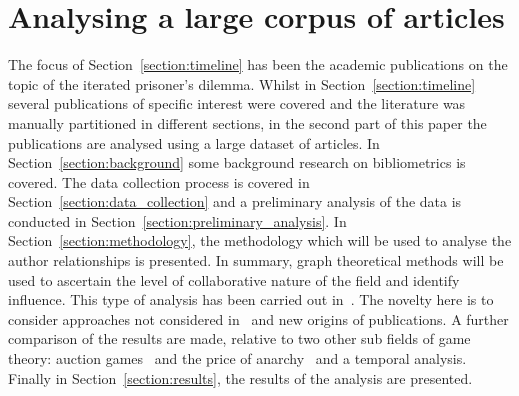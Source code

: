 \documentclass{article}
\theoremstyle{definition}
\begin{document}


\section{Analysing a large corpus of articles}\label{section:analysis}

The focus of Section~\ref{section:timeline} has been the academic publications on
the topic of the iterated prisoner's dilemma. Whilst in Section~\ref{section:timeline}
several publications of specific interest were covered and the literature was manually
partitioned in different sections, in the second part of this paper the publications
are analysed using a large dataset of articles. In Section~\ref{section:background}
some background
research on bibliometrics is covered. The data collection process is covered in
Section~\ref{section:data_collection} and a preliminary analysis of the data is
conducted in Section~\ref{section:preliminary_analysis}. In Section~\ref{section:methodology},
the methodology which will be used to analyse the author relationships is presented.
In summary, graph theoretical methods will be used to ascertain the level of
collaborative nature of the field and identify influence.
This type of analysis has been carried out in~\cite{Liu2015}. The novelty here
is to consider approaches not considered in~\cite{Liu2015} and new origins of
publications. A further comparison of the results are made, relative to
two other sub fields of game theory: auction games~\cite{menezes2005} and
the price of anarchy~\cite{roughgarden2005} and a temporal analysis.
Finally in Section~\ref{section:results}, the results of the analysis are presented.
\end{document}
